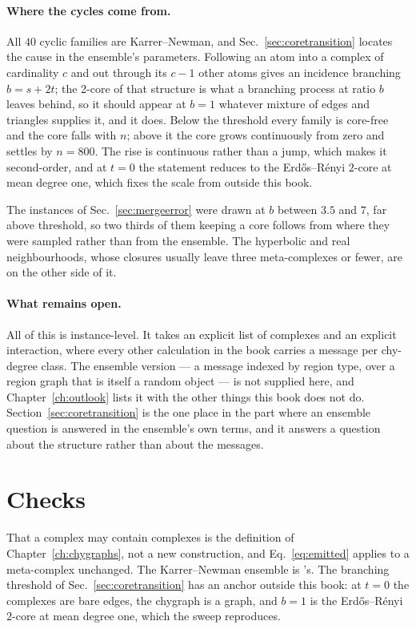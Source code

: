 \paragraph{Where the cycles come from.} All $40$ cyclic families are
Karrer--Newman, and Sec.~\ref{sec:coretransition} locates the cause in the
ensemble's parameters. Following an
atom into a complex of cardinality $c$ and out through its $c-1$ other atoms
gives an incidence branching $b=s+2t$; the 2-core of that structure is what a
branching process at ratio $b$ leaves behind, so it should appear at $b=1$
whatever mixture of edges and triangles supplies it, and it does. Below the
threshold every family is core-free and the core falls with $n$; above it the
core grows continuously from zero and settles by $n=800$. The rise is continuous
rather than a jump, which makes it second-order, and at $t=0$ the statement
reduces to the Erd\H{o}s--R\'enyi $2$-core at mean degree one, which fixes the
scale from outside this book.

The instances of Sec.~\ref{sec:mergeerror} were drawn at $b$ between $3.5$ and
$7$, far above threshold, so two thirds of them keeping a core follows from
where they were sampled rather than from the ensemble. The hyperbolic and real
neighbourhoods, whose closures usually leave three meta-complexes or fewer, are
on the other side of it.

\paragraph{What remains open.} All of this is instance-level. It takes an
explicit list of complexes and an explicit interaction, where every other
calculation in the book carries a message per chy-degree class. The ensemble
version --- a message indexed by region type, over a region graph that is itself
a random object --- is not supplied here, and Chapter~\ref{ch:outlook} lists it
with the other things this book does not do. Section~\ref{sec:coretransition} is
the one place in the part where an ensemble question is answered in the
ensemble's own terms, and it answers a question about the structure rather than
about the messages.

\section{Checks}
\label{sec:merge-checks}

That a complex may contain complexes is the definition of
Chapter~\ref{ch:chygraphs}, not a new construction, and Eq.~\eqref{eq:emitted}
applies to a meta-complex unchanged. The Karrer--Newman ensemble is
\citeauthor{karrer2010}'s. The branching threshold of
Sec.~\ref{sec:coretransition} has an anchor outside this book: at $t=0$ the
complexes are bare edges, the chygraph is a graph, and $b=1$ is the
Erd\H{o}s--R\'enyi $2$-core at mean degree one, which the sweep reproduces.

